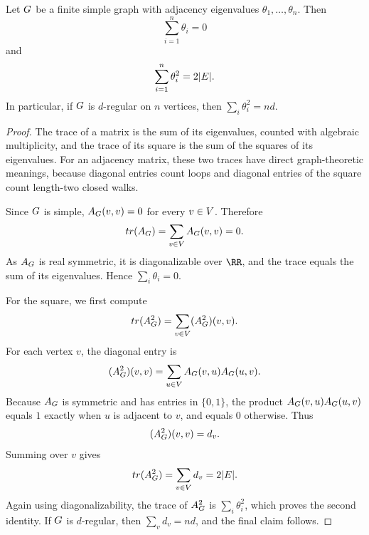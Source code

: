 \begin{lemma}
	\label{lem:adjacency-trace-identities}
	Let \(G\) be a finite simple graph with adjacency eigenvalues \(\theta_1,\ldots,\theta_n\). Then
	\begin{equation}
		\sum_{i=1}^n\theta_i=0
	\end{equation}
	and
	\begin{equation}
		\sum_{i=1}^n\theta_i^2=2\lvert E\rvert.
	\end{equation}
	In particular, if \(G\) is \(d\)-regular on \(n\) vertices, then \(\sum_i\theta_i^2=nd\).
\end{lemma}

\begin{proof}
	The trace of a matrix is the sum of its eigenvalues, counted with algebraic multiplicity, and the trace of its square is the sum of the squares of its eigenvalues. For an adjacency matrix, these two traces have direct graph-theoretic meanings, because diagonal entries count loops and diagonal entries of the square count length-two closed walks.

	Since \(G\) is simple, \(A_{G}(v,v)=0\) for every \(v\in V\). Therefore
	\begin{equation}
		tr(A_{G})=\sum_{v\in V}A_{G}(v,v)=0.
	\end{equation}
	As \(A_{G}\) is real symmetric, it is diagonalizable over \(\RR\), and the trace equals the sum of its eigenvalues. Hence \(\sum_i\theta_i=0\).

	For the square, we first compute
	\begin{equation}
		tr(A_{G}^2)=\sum_{v\in V}(A_{G}^2)(v,v).
	\end{equation}
	For each vertex \(v\), the diagonal entry is
	\begin{equation}
		(A_{G}^2)(v,v)=\sum_{u\in V}A_{G}(v,u)A_{G}(u,v).
	\end{equation}
	Because \(A_{G}\) is symmetric and has entries in \(\{0,1\}\), the product \(A_{G}(v,u)A_{G}(u,v)\) equals \(1\) exactly when \(u\) is adjacent to \(v\), and equals \(0\) otherwise. Thus
	\begin{equation}
		(A_{G}^2)(v,v)=d_v.
	\end{equation}
	Summing over \(v\) gives
	\begin{equation}
		tr(A_{G}^2)=\sum_{v\in V}d_v=2\lvert E\rvert.
	\end{equation}
	Again using diagonalizability, the trace of \(A_{G}^2\) is \(\sum_i\theta_i^2\), which proves the second identity. If \(G\) is \(d\)-regular, then \(\sum_v d_v=nd\), and the final claim follows.
\end{proof}

